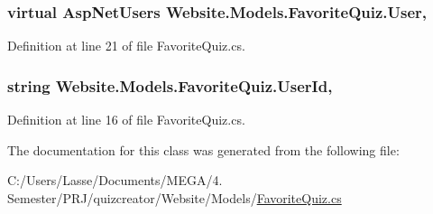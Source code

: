 \subsubsection[{User}]{\setlength{\rightskip}{0pt plus 5cm}virtual {\bf Asp\+Net\+Users} Website.\+Models.\+Favorite\+Quiz.\+User\hspace{0.3cm}{\ttfamily [get]}, {\ttfamily [set]}}\label{class_website_1_1_models_1_1_favorite_quiz_a93771e9824a5520ff5e9d0c77c0a9058}


Definition at line 21 of file Favorite\+Quiz.\+cs.

\hypertarget{class_website_1_1_models_1_1_favorite_quiz_a0b356c76b9c880718760e02263587b8a}{}
\subsubsection[{User\+Id}]{\setlength{\rightskip}{0pt plus 5cm}string Website.\+Models.\+Favorite\+Quiz.\+User\+Id\hspace{0.3cm}{\ttfamily [get]}, {\ttfamily [set]}}\label{class_website_1_1_models_1_1_favorite_quiz_a0b356c76b9c880718760e02263587b8a}


Definition at line 16 of file Favorite\+Quiz.\+cs.



The documentation for this class was generated from the following file\+:\begin{DoxyCompactItemize}
\item 
C\+:/\+Users/\+Lasse/\+Documents/\+M\+E\+G\+A/4. Semester/\+P\+R\+J/quizcreator/\+Website/\+Models/\hyperlink{_favorite_quiz_8cs}{Favorite\+Quiz.\+cs}\end{DoxyCompactItemize}
